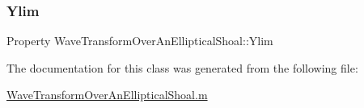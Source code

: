 \subsubsection{\texorpdfstring{Ylim}{Ylim}}
{\footnotesize\ttfamily Property Wave\+Transform\+Over\+An\+Elliptical\+Shoal\+::\+Ylim}



The documentation for this class was generated from the following file\+:\begin{DoxyCompactItemize}
\item 
\hyperlink{_wave_transform_over_an_elliptical_shoal_8m}{Wave\+Transform\+Over\+An\+Elliptical\+Shoal.\+m}\end{DoxyCompactItemize}
